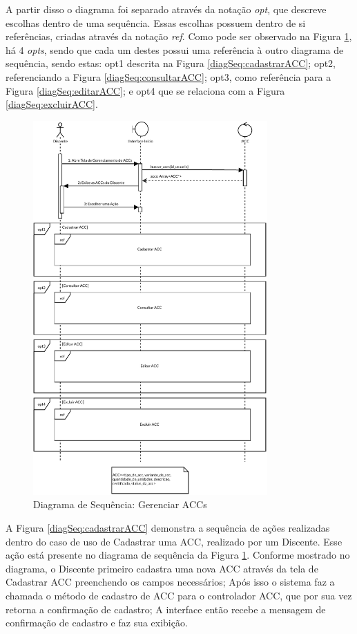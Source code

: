 A partir disso o diagrama foi separado através da notação \textit{opt}, que descreve escolhas dentro de uma sequência. Essas escolhas possuem dentro de si referências, criadas através da notação \textit{ref}. Como pode ser observado na Figura \ref{diagSeq:gerenciarACCs}, há 4 \textit{opts}, sendo que cada um destes possui uma referência à outro diagrama de sequência, sendo estas: opt1 descrita na Figura \ref{diagSeq:cadastrarACC}; opt2, referenciando a Figura \ref{diagSeq:consultarACC}; opt3, como referência para a Figura \ref{diagSeq:editarACC}; e opt4 que se relaciona com a Figura \ref{diagSeq:excluirACC}.

\begin{figure}[H]
    \centering 
    \includegraphics[width=0.8\textwidth]{dados/figuras/Proposta/DiagramasDeSequencia/Gerenciar ACCs_ Completo-Completo.pdf}
    \caption{Diagrama de Sequência: Gerenciar ACCs}
    \label{diagSeq:gerenciarACCs}
\end{figure}

A Figura \ref{diagSeq:cadastrarACC} demonstra a sequência de ações realizadas dentro do caso de uso de Cadastrar uma ACC, realizado por um Discente. Esse ação está presente no diagrama de sequência da Figura \ref{diagSeq:gerenciarACCs}. Conforme mostrado no diagrama, o Discente primeiro cadastra uma nova ACC através da tela de Cadastrar ACC preenchendo os campos necessários; Após isso o sistema faz a chamada o método de cadastro de ACC para o controlador ACC, que por sua vez retorna a confirmação de cadastro; A interface então recebe a mensagem de confirmação de cadastro e faz sua exibição.

